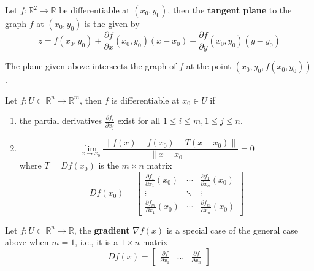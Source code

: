 \documentclass[openany]{book}
\newcommand{\R}{\mathbb{R}}
\begin{document}
\begin{defn}
    Let $f:\R^2\to\R$ be differentiable at $(x_0,y_0)$, then the \textbf{tangent plane} to the graph $f$ at $(x_0, y_0)$ is the given by 
    \begin{equation*}
        z=f(x_0,y_0)+\frac{\partial f}{\partial x}(x_0,y_0)(x-x_0)+\frac{\partial f}{\partial y}(x_0,y_0)(y-y_0)
    \end{equation*}
    \begin{remark}
        The plane given above intersects the graph of $f$ at the point $(x_0, y_0, f(x_0, y_0))$.
    \end{remark}
\end{defn}


\begin{defn}
    Let $f:U\subset\R^n\to\R^m$, then $f$ is differentiable at $x_0\in U$ if
    \begin{enumerate}
        \item[(1)] the partial derivatives $\frac{\partial f_i}{\partial x_j}$ exist for all $1\leq i\leq m, 1\leq j\leq n$. 
        \item[(2)]
        \begin{equation*}
            \lim_{x\to x_0}\frac{\|f(x)-f(x_0)-T(x-x_0)\|}{\|x-x_0\|}=0
        \end{equation*}
        where $T=Df(x_0)$ is the $m\times n$ matrix 
        \begin{equation*}
            Df(x_0)=
            \begin{bmatrix}
            \frac{\partial f_1}{\partial x_1}(x_0) & \cdots & \frac{\partial f_1}{\partial x_n}(x_0) \\
            \vdots & \ddots & \vdots \\
            \frac{\partial f_m}{\partial x_1}(x_0) & \cdots & \frac{\partial f_m}{\partial x_n}(x_0)
            \end{bmatrix}
        \end{equation*}
    \end{enumerate}
\end{defn}

\begin{defn}[gradient]
    Let $f:U\subset\R^n\to\R$, the \textbf{gradient} $\nabla f(x)$ is a special case of the general case above when $m=1$, i.e., it is a $1\times n$ matrix 
    \begin{equation*}
        Df(x)=\begin{bmatrix}
            \frac{\partial f}{\partial x_1}&\dots&\frac{\partial f}{\partial x_n}
        \end{bmatrix}
    \end{equation*}
\end{defn}
\end{document}
